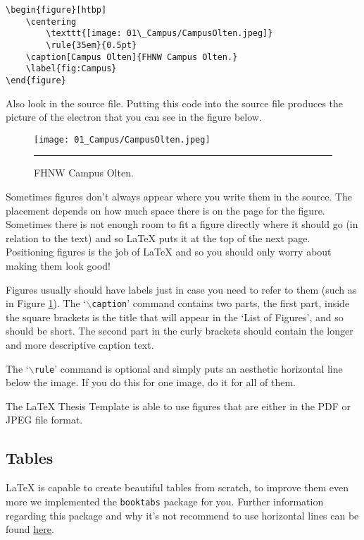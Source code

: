 \begin{verbatim}
\begin{figure}[htbp]
	\centering
		\texttt{[image: 01\_Campus/CampusOlten.jpeg]}
		\rule{35em}{0.5pt}
	\caption[Campus Olten]{FHNW Campus Olten.}
	\label{fig:Campus}
\end{figure}
\end{verbatim}

Also look in the source file. Putting this code into the source file produces the picture of the electron that you can see in the figure below.

\begin{figure}[htbp]
	\centering
		\texttt{[image: 01\_Campus/CampusOlten.jpeg]}
		\rule{35em}{0.5pt}
	\caption[Campus Olten]{FHNW Campus Olten.}
	\label{fig:Campus}
\end{figure}

Sometimes figures don't always appear where you write them in the source. The placement depends on how much space there is on the page for the figure. Sometimes there is not enough room to fit a figure directly where it should go (in relation to the text) and so \LaTeX{} puts it at the top of the next page. Positioning figures is the job of \LaTeX{} and so you should only worry about making them look good!

Figures usually should have labels just in case you need to refer to them (such as in Figure \ref{fig:Campus}). The `$\backslash$\texttt{caption}' command contains two parts, the first part, inside the square brackets is the title that will appear in the `List of Figures', and so should be short. The second part in the curly brackets should contain the longer and more descriptive caption text.

The `$\backslash$\texttt{rule}' command is optional and simply puts an aesthetic horizontal line below the image. If you do this for one image, do it for all of them.

The \LaTeX{} Thesis Template is able to use figures that are either in the PDF or JPEG file format.

\subsection{Tables}

\LaTeX{} is capable to create beautiful tables from scratch, to improve them even more we implemented the \texttt{booktabs} package for you. Further information regarding this package and why it's not recommend to use horizontal lines can be found \href{http://texdoc.net/texmf-dist/doc/latex/booktabs/booktabs.pdf}{here}.

